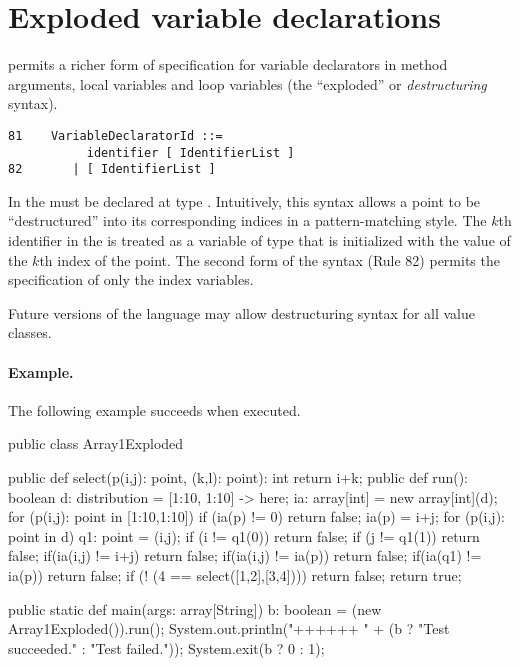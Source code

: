 \section{Exploded variable declarations}\label{exploded-syntax}

\Xten{} permits a richer form of specification for variable
declarators in method arguments, local variables and loop variables
(the ``exploded'' or {\em destructuring} syntax).
\begin{verbatim}
81    VariableDeclaratorId ::= 
           identifier [ IdentifierList ]
82       | [ IdentifierList ]
\end{verbatim}
In \XtenCurrVer{} the  must be declared at
type . Intuitively, this syntax allows a
point to be ``destructured'' into its corresponding  
indices in a pattern-matching style.
The $k$th identifier in the  is treated as a  variable of type 
that is initialized with the value of the $k$th index of the point. 
The second form of the syntax (Rule 82) permits the specification of only
the index variables.

Future versions of the language may allow destructuring syntax for all
value classes.

\paragraph{Example.}
The following example succeeds when executed.
\begin{xten}
public class Array1Exploded {
  public def select(p(i,j): point, (k,l): point): int {
      return i+k;
  }
  public def run(): boolean {
    d: distribution = [1:10, 1:10] -> here;
    ia: array[int] = new array[int](d);
    for (p(i,j): point in [1:10,1:10]) {
        if (ia(p) != 0) return false;
        ia(p) = i+j;
    }
    for (p(i,j): point in d) {
      q1: point = (i,j);
      if (i != q1(0)) return false;
      if (j != q1(1)) return false;
      if(ia(i,j) != i+j) return false;
      if(ia(i,j) != ia(p)) return false;
      if(ia(q1)  != ia(p)) return false;
    }
    if (! (4 == select([1,2],[3,4]))) return false;
    return true;
  }
        
  public static def main(args: array[String]) {
     b: boolean = (new Array1Exploded()).run();
     System.out.println("++++++ "
                        + (b ? "Test succeeded."
                             : "Test failed."));
     System.exit(b ? 0 : 1);
  }
}
\end{xten}

 \par  %



